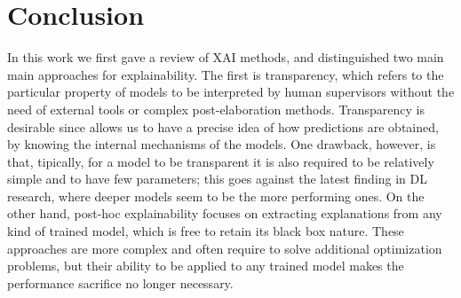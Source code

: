 \chapter{Conclusion}
\label{conclusion}
In this work we first gave a review of XAI methods, and distinguished two main main approaches for explainability. The first is transparency, which refers to the particular property of models to be interpreted by human supervisors without the need of external tools or complex post-elaboration methods. Transparency is desirable since allows us to have a precise idea of how predictions are obtained, by knowing the internal mechanisms of the models. One drawback, however, is that, tipically, for a model to be transparent it is also required to be relatively simple and to have few parameters; this goes against the latest finding in DL research, where deeper models seem to be the more performing ones. On the other hand, post-hoc explainability focuses on extracting explanations from any kind of trained model, which is free to retain its black box nature. These approaches are more complex and often require to solve additional optimization problems, but their ability to be applied to any trained model makes the performance sacrifice no longer necessary.

